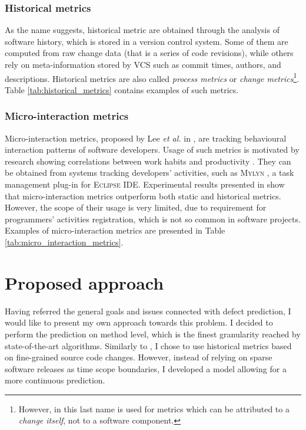 \documentclass{pracamgr}
\begin{document}

\subsection{Historical metrics}
\label{sec:historical}
As the name suggests, historical metric are obtained through the analysis of software history, which is stored in a version control system. Some of them are computed from raw change data (that is a series of code revisions), while others rely on meta-information stored by VCS such as commit times, authors, and descriptions. Historical metrics are also called \emph{process metrics} or \emph{change metrics}\footnote{However, in \cite{Fukushima} this last name is used for metrics which can be attributed to a \textit{change itself}, not to a software component.}. Table \ref{tab:historical_metrics} contains examples of such metrics.


\subsection{Micro-interaction metrics}
\label{sec:micro-interaction}
Micro-interaction metrics, proposed by Lee \textit{et al.} in \cite{micro_interaction}, are tracking behavioural interaction patterns of software developers. Usage of such metrics is motivated by research showing correlations between work habits and productivity \cite{LaToza}. They can be obtained from systems tracking developers' activities, such as \textsc{Mylyn} \cite{mylyn}, a task management plug-in for \textsc{Eclipse IDE}. Experimental results presented in \cite{micro_interaction} show that micro-interaction metrics outperform both static and historical metrics. However, the scope of their usage is very limited, due to requirement for programmers' activities registration, which is not so common in software projects. Examples of micro-interaction metrics are presented in Table \ref{tab:micro_interaction_metrics}.


\chapter{Proposed approach}
\label{cha:approach}
Having referred the general goals and issues connected with defect prediction, I would like to present my own approach towards this problem. I decided to perform the prediction on method level, which is the finest granularity reached by state-of-the-art algorithms. Similarly to \cite{method-level}, I chose to use historical metrics based on fine-grained source code changes. However, instead of relying on sparse software releases as time scope boundaries, I developed a model allowing for a more continuous prediction.
\end{document}
